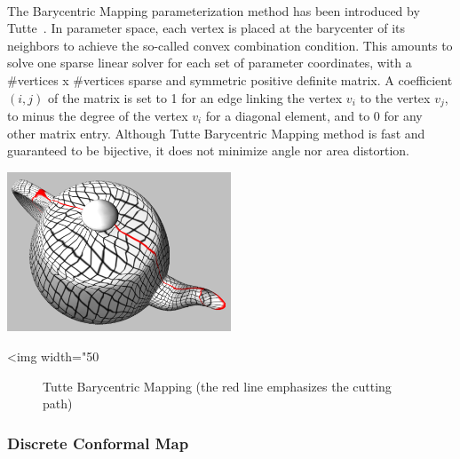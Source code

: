   \\

The Barycentric Mapping parameterization method has been introduced by
Tutte~\cite{t-hdg-63}. In parameter space, each vertex is
placed at the barycenter of its neighbors to achieve the so-called
convex combination condition. This amounts to solve one
sparse linear solver for each set of parameter coordinates, with a
\#vertices x \#vertices sparse and symmetric positive definite matrix.
A coefficient $(i,j)$ of the matrix is set to 1 for an edge linking
the vertex $v_i$ to the vertex $v_j$, to minus the degree of the
vertex $v_i$ for a diagonal element, and to 0 for any other matrix
entry. Although Tutte Barycentric Mapping method is fast and
guaranteed to be bijective, it does not minimize angle nor area
distortion.

\begin{center}
    \label{Surface_mesh_parameterization-fig-uniform}
    \begin{ccTexOnly}
        \includegraphics[width=0.5\textwidth]{Surface_mesh_parameterization/uniform} %
    \end{ccTexOnly}
    \begin{ccHtmlOnly}
        <img width="50%
    \end{ccHtmlOnly}
    \begin{figure}[h]
        \caption{Tutte Barycentric Mapping (the red line emphasizes the cutting path)}
    \end{figure}
\end{center}


\subsubsection{Discrete Conformal Map}

